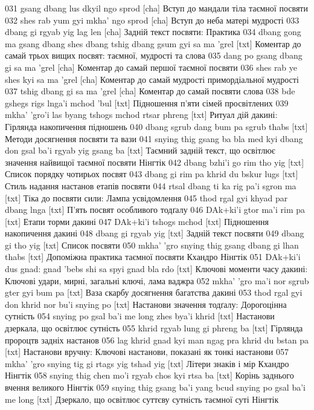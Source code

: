 \documentclass{article}
\begin{document}
031 gsang dbang lus dkyil ngo sprod [cha] Вступ до мандали тіла таємної посвяти
032 shes rab yum gyi mkha' ngo sprod [cha] Вступ до неба матері мудрості
033 dbang gi rgyab yig lag len [cha] Задній текст посвяти: Практика
034 dbang gong ma gsang dbang shes dbang tshig dbang gsum gyi sa ma 'grel [txt] Коментар до самай трьох вищих посвят: таємної, мудрості та слова
035 dang po gsang dbang gi sa ma 'grel [cha] Коментар до самай першої таємної посвяти
036 shes rab ye shes kyi sa ma 'grel [cha] Коментар до самай мудрості примордіальної мудрості
037 tshig dbang gi sa ma 'grel [cha] Коментар до самай посвяти слова
038 bde gshegs rigs lnga'i mchod 'bul [txt] Підношення п'яти сімей просвітлених
039 mkha' 'gro'i las byang tshogs mchod rtsar phreng [txt] Ритуал дій дакині: Гірлянда накопичення підношень
040 dbang sgrub dang bum pa sgrub thabs [txt] Методи досягнення посвяти та вази
041 snying thig gsang ba bla med kyi dbang don gsal ba'i rgyab yig gsang ba [txt] Таємний задній текст, що освітлює значення найвищої таємної посвяти Нінгтік
042 dbang bzhi'i go rim tho yig [txt] Список порядку чотирьох посвят
043 dbang gi rim pa khrid du bskur lugs [txt] Стиль надання настанов етапів посвяти
044 rtsal dbang ti ka rig pa'i sgron ma [txt] Тіка до посвяти сили: Лампа усвідомлення
045 thod rgal gyi khyad par dbang lnga [txt] П'ять посвят особливого тодґалу
046 DAk+ki'i gtor ma'i rim pa [txt] Етапи торми дакині
047 DAk+ki'i tshogs mchod [txt] Підношення накопичення дакині
048 dbang gi rgyab yig [txt] Задній текст посвяти
049 dbang gi tho yig [txt] Список посвяти
050 mkha' 'gro snying thig gsang dbang gi lhan thabs [txt] Допоміжна практика таємної посвяти Кхандро Нінгтік
051 DAk+ki'i dus gnad: gnad 'bebs shi sa spyi gnad bla rdo [txt] Ключові моменти часу дакині: Ключові удари, мирні, загальні ключі, лама ваджра
052 mkha' 'gro ma'i nor sgrub gter gyi bum pa [txt] Ваза скарбу досягнення багатства дакині
053 thod rgal gyi don khrid nor bu'i snying po [txt] Настанови значення тодґалу: Дорогоцінна сутність
054 snying po gsal ba'i me long zhes bya'i khrid [txt] Настанови дзеркала, що освітлює сутність
055 khrid rgyab lung gi phreng ba [txt] Гірлянда пророцтв задніх настанов
056 lag khrid gnad kyi man ngag pra khrid du bstan pa [txt] Настанови вручну: Ключові настанови, показані як тонкі настанови
057 mkha' 'gro snying tig gi rtags yig tshad yig [txt] Літери знаків і мір Кхандро Нінгтік
058 snying thig chen mo'i rgyab chos kyi rtsa ba [txt] Корінь заднього вчення великого Нінгтік
059 snying thig gsang ba'i yang bcud snying po gsal ba'i me long [txt] Дзеркало, що освітлює суттєву сутність таємної суті Нінгтік
\end{document}

